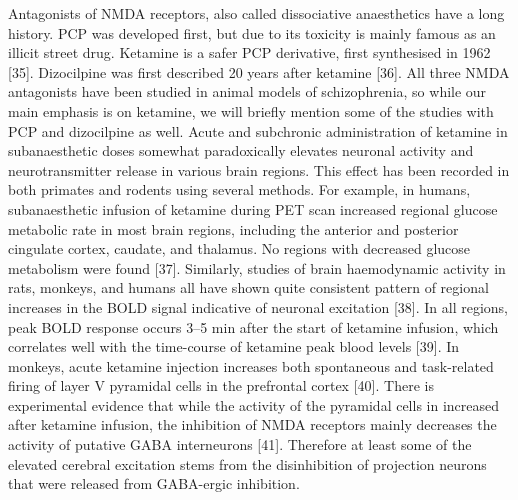 \documentclass[man]{apa6}
\begin{document}
Antagonists of NMDA receptors, also called dissociative anaesthetics have a long history.
PCP was developed first, but due to its toxicity is mainly famous as an illicit street drug. Ketamine is a safer PCP derivative, first synthesised in 1962 {[}35{]}. Dizocilpine was first described 20 years after ketamine {[}36{]}. All three NMDA antagonists have been studied in animal models of schizophrenia, so while our main emphasis is on ketamine, we will briefly mention some of the studies with PCP and dizocilpine as well. Acute and subchronic administration of ketamine in subanaesthetic doses somewhat paradoxically elevates neuronal activity and neurotransmitter release in various brain regions. This effect has been recorded in both primates and rodents using several methods. For example, in humans, subanaesthetic infusion of ketamine during PET scan increased regional glucose metabolic rate in most brain regions, including the anterior and posterior cingulate cortex, caudate, and thalamus. No regions with decreased glucose metabolism were found {[}37{]}. Similarly, studies of brain haemodynamic activity in rats, monkeys, and humans all have shown quite consistent pattern of regional increases in the BOLD signal indicative of neuronal excitation {[}38{]}. In all regions, peak BOLD response occurs 3--5 min after the start of ketamine infusion, which correlates well with the time-course of ketamine peak blood levels {[}39{]}. In monkeys, acute ketamine injection increases both spontaneous and task-related firing of layer V pyramidal cells in the prefrontal cortex {[}40{]}. There is experimental evidence that while the activity of the pyramidal cells in increased after ketamine infusion, the inhibition of NMDA receptors mainly decreases the activity of putative GABA interneurons {[}41{]}. Therefore at least some of the elevated cerebral excitation stems from the disinhibition of projection neurons that were released from GABA-ergic inhibition.
\end{document}
